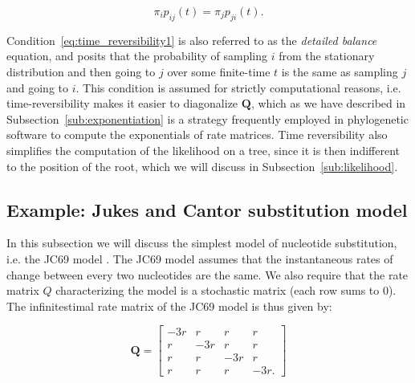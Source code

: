 \begin{equation}
\pi_{i}p_{ij}(t)=\pi_{j}p_{ji}(t).
\label{eq:time_reversibility1}
\end{equation}

\noindent
Condition~\ref{eq:time_reversibility1} is also referred to as the \emph{detailed balance} equation, and posits that the probability of sampling $i$ from the stationary distribution and then going to $j$ over some finite-time $t$ is the same as sampling $j$ and going to $i$. 
% 
% 
This condition is assumed for strictly computational reasons, i.e. time-reversibility makes it easier to diagonalize $\mathbf{Q}$, which as we have described in 
Subsection~\ref{sub:exponentiation} is a strategy frequently employed in phylogenetic software to compute the exponentials of rate matrices.
Time reversibility also simplifies the computation of the likelihood on a tree, since it is then indifferent to the position of the root, which we will discuss in Subsection~\ref{sub:likelihood}.

\subsection{Example: Jukes and Cantor substitution model\label{sub:jc69}}

In this subsection we will discuss the simplest model of nucleotide substitution, i.e. the JC69 model \citep{Jukes1969}.
The JC69 model assumes that the instantaneous rates of change between every two nucleotides are the same.
We also require that the rate matrix $Q$ characterizing the model is a stochastic matrix (each row sums to 0).
The infinitestimal rate matrix of the JC69 model is thus given by:

\begin{equation}
\mathbf{Q}=\left[\begin{array}{cccc}
-3r & r & r & r\\
r & -3r & r & r\\
r & r & -3r & r\\
r & r & r & -3r.
\end{array}\right]
\label{eq:jc69}
\end{equation}

